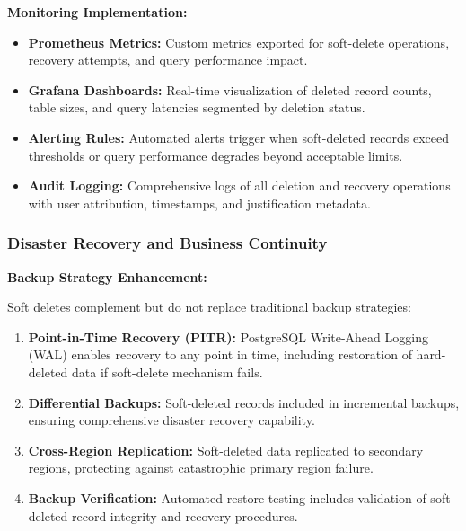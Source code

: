 \documentclass[12pt,a4paper]{article}
\begin{document}
\begin{tcolorbox}[colback=primaryblue!5, colframe=primaryblue, boxrule=1pt, arc=3pt, left=10pt, right=10pt, top=8pt, bottom=8pt]
\vspace{0.5em}

\textbf{Monitoring Implementation:}

\begin{itemize}[leftmargin=2em, itemsep=6pt]
    \item \textbf{Prometheus Metrics:} Custom metrics exported for soft-delete operations, recovery attempts, and query performance impact.
    \item \textbf{Grafana Dashboards:} Real-time visualization of deleted record counts, table sizes, and query latencies segmented by deletion status.
    \item \textbf{Alerting Rules:} Automated alerts trigger when soft-deleted records exceed thresholds or query performance degrades beyond acceptable limits.
    \item \textbf{Audit Logging:} Comprehensive logs of all deletion and recovery operations with user attribution, timestamps, and justification metadata.
\end{itemize}

\subsubsection{Disaster Recovery and Business Continuity}

\textbf{Backup Strategy Enhancement:}

Soft deletes complement but do not replace traditional backup strategies:

\begin{enumerate}[leftmargin=2em, itemsep=6pt]
    \item \textbf{Point-in-Time Recovery (PITR):} PostgreSQL Write-Ahead Logging (WAL) enables recovery to any point in time, including restoration of hard-deleted data if soft-delete mechanism fails.
    \item \textbf{Differential Backups:} Soft-deleted records included in incremental backups, ensuring comprehensive disaster recovery capability.
    \item \textbf{Cross-Region Replication:} Soft-deleted data replicated to secondary regions, protecting against catastrophic primary region failure.
    \item \textbf{Backup Verification:} Automated restore testing includes validation of soft-deleted record integrity and recovery procedures.
\end{enumerate}

\vspace{0.5em}


\end{tcolorbox}
\end{document}
